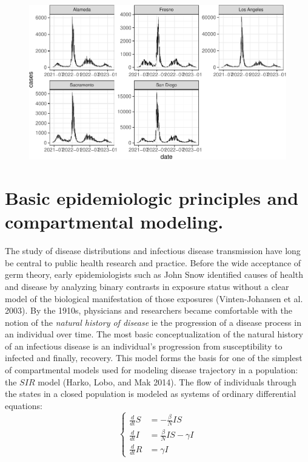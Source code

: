 \documentclass[
  11pt,
  letterpaper,
  DIV=11,
  numbers=noendperiod]{scrartcl}
\begin{document}
\begin{figure}

{\centering \includegraphics{progress_files/figure-pdf/unnamed-chunk-3-1.pdf}

}

\end{figure}

\hypertarget{basic-epidemiologic-principles-and-compartmental-modeling.}{%
\section{Basic epidemiologic principles and compartmental
modeling.}\label{basic-epidemiologic-principles-and-compartmental-modeling.}}

The study of disease distributions and infectious disease transmission
have long be central to public health research and practice. Before the
wide acceptance of germ theory, early epidemiologists such as John Snow
identified causes of health and disease by analyzing binary contrasts in
exposure status without a clear model of the biological manifestation of
those exposures (Vinten-Johansen et al. 2003). By the 1910s, physicians
and researchers became comfortable with the notion of the \emph{natural
history of disease} ie the progression of a disease process in an
individual over time. The most basic conceptualization of the natural
history of an infectious disease is an individual's progression from
susceptibility to infected and finally, recovery. This model forms the
basis for one of the simplest of compartmental models used for modeling
disease trajectory in a population: the \(SIR\) model (Harko, Lobo, and
Mak 2014). The flow of individuals through the states in a closed
population is modeled as systems of ordinary differential equations:
\[\left\{
\begin{aligned}
\frac{d}{dt} S & = - \frac{\beta}{N} I S \\
\frac{d}{dt} I & = \frac{\beta}{N} I S  -  \gamma I \\
\frac{d}{dt} R & = \gamma I
\end{aligned}
\right.\]
\end{document}
